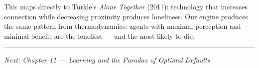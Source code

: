 This maps directly to Turkle's \emph{Alone Together} (2011): technology that increases connection while decreasing proximity produces loneliness. Our engine produces the same pattern from thermodynamics: agents with maximal perception and minimal benefit are the loneliest --- and the most likely to die.

\begin{center}\rule{0.5\linewidth}{0.5pt}\end{center}

\emph{Next: Chapter 11 --- Learning and the Paradox of Optimal Defaults}
